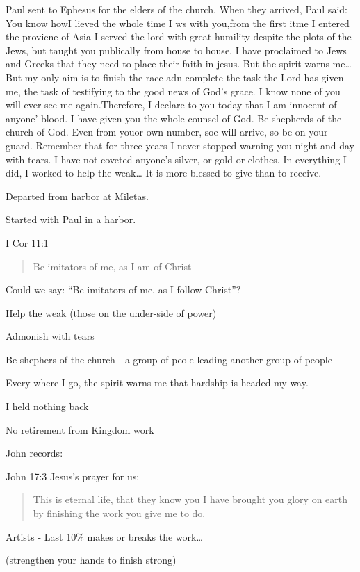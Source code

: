 \documentclass[
]{book}
\begin{document}
Paul sent to Ephesus for the elders of the church. When they arrived, Paul said: You know howI lieved the whole time I ws with you,from the first itme I entered the provicne of Asia I served the lord with great humility despite the plots of the Jews, but taught you publically from house to house. I have proclaimed to Jews and Greeks that they need to place their faith in jesus. But the spirit warns me\ldots{} But my only aim is to finish the race adn complete the task the Lord has given me, the task of testifying to the good news of God's grace. I know none of you will ever see me again.Therefore, I declare to you today that I am innocent of anyone' blood. I have given you the whole counsel of God. Be shepherds of the church of God. Even from youor own number, soe will arrive, so be on your guard. Remember that for three years I never stopped warning you night and day with tears. I have not coveted anyone's silver, or gold or clothes. In everything I did, I worked to help the weak\ldots{} It is more blessed to give than to receive.

Departed from harbor at Miletas.

Started with Paul in a harbor.

I Cor 11:1

\begin{quote}
Be imitators of me, as I am of Christ
\end{quote}

Could we say: ``Be imitators of me, as I follow Christ''?

Help the weak (those on the under-side of power)

Admonish with tears

Be shephers of the church - a group of peole leading another group of people

Every where I go, the spirit warns me that hardship is headed my way.

I held nothing back

No retirement from Kingdom work

John records:

John 17:3 Jesus's prayer for us:

\begin{quote}
This is eternal life, that they know you I have brought you glory on earth by finishing the work you give me to do.
\end{quote}

Artists - Last 10\% makes or breaks the work\ldots{}

(strengthen your hands to finish strong)
\end{document}
